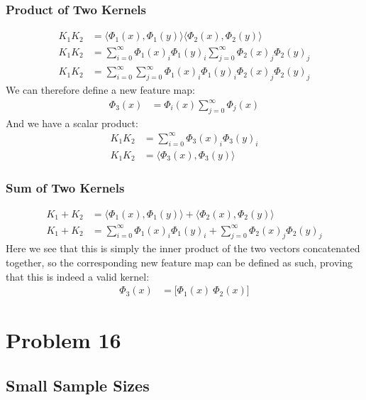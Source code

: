 \documentclass[a4paper,12pt]{article}
\begin{document}
\subsubsection*{Product of Two Kernels}

\begin{align*}
K_1K_2 &= \langle \Phi_1(x), \Phi_1(y) \rangle \langle \Phi_2(x), \Phi_2(y) \rangle \\
K_1K_2 &= \sum_{i=0}^{\infty} \Phi_1(x)_i\Phi_1(y)_i \sum_{j=0}^{\infty} \Phi_2(x)_j\Phi_2(y)_j \\
K_1K_2 &= \sum_{i=0}^{\infty} \sum_{j=0}^{\infty} \Phi_1(x)_i\Phi_1(y)_i\Phi_2(x)_j\Phi_2(y)_j
\end{align*}
We can therefore define a new feature map:
\begin{align*}
\Phi_3(x) &= \Phi_i(x) \sum_{j=0}^{\infty} \Phi_j(x)
\end{align*}
And we have a scalar product:
\begin{align*}
K_1K_2 &= \sum_{i=0}^{\infty} \Phi_3(x)_i\Phi_3(y)_i \\
K_1K_2 &= \langle \Phi_3(x), \Phi_3(y) \rangle
\end{align*}

\subsubsection*{Sum of Two Kernels}

\begin{align*}
K_1 + K_2 &= \langle \Phi_1(x), \Phi_1(y) \rangle + \langle \Phi_2(x), \Phi_2(y) \rangle \\
K_1 + K_2 &= \sum_{i=0}^{\infty} \Phi_1(x)_i\Phi_1(y)_i + \sum_{j=0}^{\infty} \Phi_2(x)_j\Phi_2(y)_j
\end{align*}
Here we see that this is simply the inner product of the two vectors concatenated together, so the corresponding new feature map can be defined as such, proving that this is indeed a valid kernel:
\begin{align*}
\Phi_3(x) &= \big[ \Phi_1(x) \ \Phi_2(x) \big]
\end{align*}

\section*{Problem 16}




\subsection*{Small Sample Sizes}
\end{document}
